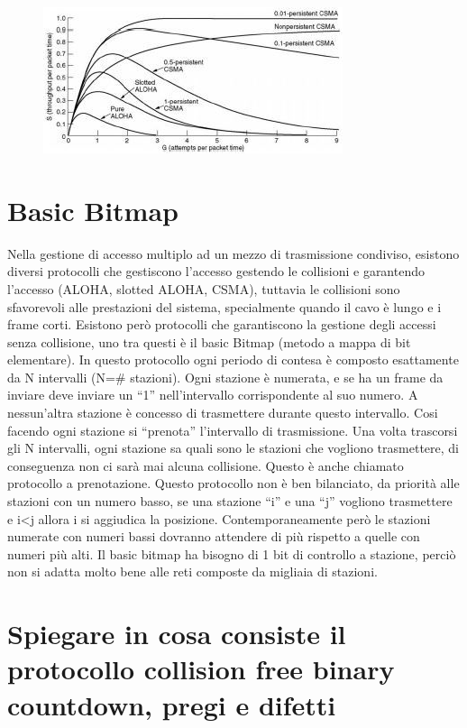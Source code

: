 \begin{figure}[H]
\centering
\includegraphics[scale=1]{res/img/23_CSMA.png}
\end{figure}

\section{Basic Bitmap}

Nella gestione di accesso multiplo ad un mezzo di trasmissione condiviso, esistono diversi protocolli che gestiscono l’accesso gestendo le collisioni e garantendo l’accesso (ALOHA, slotted ALOHA, CSMA), tuttavia le collisioni sono sfavorevoli alle prestazioni del sistema, specialmente quando il cavo è lungo e i frame corti.
Esistono però protocolli che garantiscono la gestione degli accessi senza collisione, uno tra questi è il basic Bitmap (metodo a mappa di bit elementare). In questo protocollo ogni periodo di contesa è composto esattamente da N intervalli (N=\# stazioni). Ogni stazione è numerata, e se ha un frame da inviare deve inviare un “1” nell’intervallo corrispondente al suo numero. A nessun’altra stazione è concesso di trasmettere durante questo intervallo. Cosi facendo ogni stazione si “prenota” l’intervallo di trasmissione. Una volta trascorsi gli N intervalli, ogni stazione sa quali sono le stazioni che vogliono trasmettere, di conseguenza non ci sarà mai alcuna collisione.
Questo è anche chiamato protocollo a prenotazione.
Questo protocollo non è ben bilanciato, da priorità alle stazioni con un numero basso, se una stazione “i” e una “j” vogliono trasmettere e i<j allora i si aggiudica la posizione.
Contemporaneamente però le stazioni numerate con numeri bassi dovranno attendere di più rispetto a quelle con numeri più alti.
Il basic bitmap ha bisogno di 1 bit di controllo a stazione, perciò non si adatta molto bene alle reti composte da migliaia di stazioni.

\section{Spiegare in cosa consiste il protocollo collision free binary countdown, pregi e difetti}

